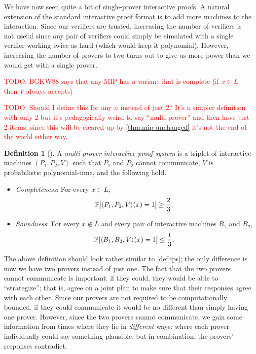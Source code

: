 \documentclass[english,12pt]{reedthesis}
\theoremstyle{plain}
\theoremstyle{definition}
\newtheorem{defn}[defn]{Definition}
\theoremstyle{remark}
\DeclarePairedDelimiter{\ang}{\langle}{\rangle}
\newcommand{\TODO}[1]{\textcolor{red}{TODO: #1}}
\begin{document}
We have now seen quite a bit of single-prover interactive proofs. A natural
extension of the standard interactive proof format is to add more machines to
the interaction. Since our verifiers are trusted, increasing the number of
verifiers is not useful since any pair of verifiers could simply be simulated
with a single verifier working twice as hard (which would keep it polynomial).
However, increasing the number of provers to two turns out to give us more power
than we would get with a single prover.

\TODO{BGKW88 says that any MIP has a variant that is complete (if $x \in L$ then
  $V$ always accepts)}

\TODO{Should I define this for any $n$ instead of just 2? It's a simpler
  definition with only 2 but it's pedagogically weird to say ``multi-prover''
  and then have just 2 items; since this will be cleared up by
  \cref{thm:mip-unchanged} it's not the end of the world either way.}
\begin{defn}[{\cite[Def.\ 4.11.2]{Go01}}]\label{def:mps}
  A \emph{multi-prover interactive proof system} is a triplet of interactive
  machines $(P_{1}, P_{2}, V)$ such that $P_{1}$ and $P_{2}$ cannot communicate,
  $V$ is probabilistic polynomial-time, and the following hold.
  \begin{itemize}
    \item \emph{Completeness}: For every $x \in L$,
          \[
            \mathbb{P}[\ang{P_{1}, P_{2}, V}(x) = 1] \ge \frac{2}{3}.
          \]
    \item \emph{Soundness}: For every $x \notin L$ and every pair of interactive
          machines $B_{1}$ and $B_{2}$,
          \[
            \mathbb{P}[\ang{B_{1}, B_{2}, V}(x) = 1] \le \frac{1}{3}.
          \]
  \end{itemize}
\end{defn}

The above definition should look rather similar to \cref{def:ips}; the only
difference is now we have two provers instead of just one. The fact that the two
provers cannot communicate is important: if they could, they would be able to
``strategize''; that is, agree on a joint plan to make sure that their responses
agree with each other. Since our provers are not required to be computationally
bounded, if they could communicate it would be no different than simply having
one prover. However, since the two provers cannot communicate, we gain some
information from times where they lie in \emph{different} ways: where each
prover individually could say something plausible, but in combination, the
provers' responses contradict.
\end{document}
